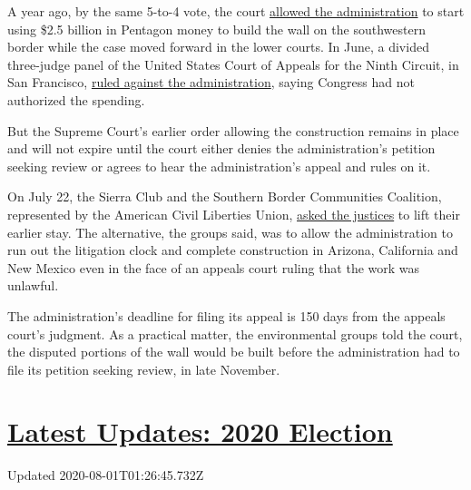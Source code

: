 A year ago, by the same 5-to-4 vote, the court
\href{https://www.supremecourt.gov/opinions/18pdf/19a60_o75p.pdf}{allowed
the administration} to start using \$2.5 billion in Pentagon money to
build the wall on the southwestern border while the case moved forward
in the lower courts. In June, a divided three-judge panel of the United
States Court of Appeals for the Ninth Circuit, in San Francisco,
\href{https://cdn.ca9.uscourts.gov/datastore/opinions/2020/06/26/19-16102.pdf}{ruled
against the administration}, saying Congress had not authorized the
spending.

But the Supreme Court's earlier order allowing the construction remains
in place and will not expire until the court either denies the
administration's petition seeking review or agrees to hear the
administration's appeal and rules on it.

On July 22, the Sierra Club and the Southern Border Communities
Coalition, represented by the American Civil Liberties Union,
\href{https://www.supremecourt.gov/DocketPDF/19/19A60/148405/20200722140912601_2020.07.21\%20stay\%20lift\%20motion\%20FINAL.pdf}{asked
the justices} to lift their earlier stay. The alternative, the groups
said, was to allow the administration to run out the litigation clock
and complete construction in Arizona, California and New Mexico even in
the face of an appeals court ruling that the work was unlawful.

The administration's deadline for filing its appeal is 150 days from the
appeals court's judgment. As a practical matter, the environmental
groups told the court, the disputed portions of the wall would be built
before the administration had to file its petition seeking review, in
late November.

\hypertarget{latest-updates-2020-election}{%
\section{\texorpdfstring{\href{https://www.nytimes.com/2020/07/31/us/elections/biden-vs-trump.html?action=click\&pgtype=Article\&state=default\&region=MAIN_CONTENT_1\&context=storylines_live_updates}{Latest
Updates: 2020
Election}}{Latest Updates: 2020 Election}}\label{latest-updates-2020-election}}

Updated 2020-08-01T01:26:45.732Z


